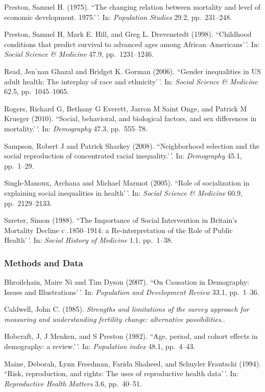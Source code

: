 \documentclass[11pt,]{article}
\begin{document}
Preston, Samuel H. (1975). ``The changing relation between mortality and
level of economic development. 1975.'\,'. In: \emph{Population Studies}
29.2, pp.~231--248.

Preston, Samuel H, Mark E. Hill, and Greg L. Drevenstedt (1998).
``Childhood conditions that predict survival to advanced ages among
African--Americans'\,'. In: \emph{Social Science \& Medicine} 47.9,
pp.~1231--1246.

Read, Jen'nan Ghazal and Bridget K. Gorman (2006). ``Gender inequalities
in US adult health: The interplay of race and ethnicity'\,'. In:
\emph{Social Science \& Medicine} 62.5, pp.~1045--1065.

Rogers, Richard G, Bethany G Everett, Jarron M Saint Onge, and Patrick M
Krueger (2010). ``Social, behavioral, and biological factors, and sex
differences in mortality.'\,'. In: \emph{Demography} 47.3, pp.~555--78.

Sampson, Robert J and Patrick Sharkey (2008). ``Neighborhood selection
and the social reproduction of concentrated racial inequality.'\,'. In:
\emph{Demography} 45.1, pp.~1--29.

Singh-Manoux, Archana and Michael Marmot (2005). ``Role of socialization
in explaining social inequalities in health'\,'. In:
\emph{Social Science \& Medicine} 60.9, pp.~2129--2133.

Szreter, Simon (1988). ``The Importance of Social Intervention in
Britain's Mortality Decline c .1850--1914: a Re-interpretation of the
Role of Public Health'\,'. In: \emph{Social History of Medicine} 1.1,
pp.~1--38.

\hypertarget{methods-and-data}{%
\subsubsection{Methods and Data}\label{methods-and-data}}

Bhroilchain, Maire Ni and Tim Dyson (2007). ``On Causation in
Demography: Issues and Illustrations'\,'. In:
\emph{Population and Development Review} 33.1, pp.~1--36.

Caldwell, John C. (1985).
\emph{Strengths and limitations of the survey approach for measuring and understanding fertility change: alternative possibilities.}.

Hobcraft, J, J Menken, and S Preston (1982). ``Age, period, and cohort
effects in demography: a review.'\,'. In: \emph{Population index} 48.1,
pp.~4--43.

Maine, Deborah, Lynn Freedman, Farida Shaheed, and Schuyler Frautschi
(1994). ``Risk, reproduction, and rights: The uses of reproductive
health data'\,'. In: \emph{Reproductive Health Matters} 3.6, pp.~40--51.
\end{document}
